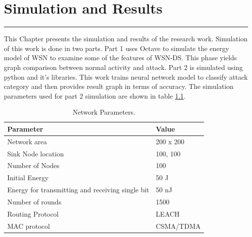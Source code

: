 \chapter{Simulation and Results}
\label{C6} %
\graphicspath{{Figures/PDF/}{Figures/PNG}}
\noindent\rule{\linewidth}{2pt}
This Chapter presents the simulation and results of the research work. Simulation of this work is done in two parts. Part 1 uses Octave to simulate the energy model of WSN to examine some of the features of WSN-DS. This phase yields graph comparison between normal activity and attack. Part 2 is simulated using python and it's libraries. This work trains neural network model to classify attack category and then provides result graph in terms of accuracy. The simulation parameters used for part 2 simulation are shown in table \ref{tab:NetPar}.
\begin{table}[bp]
\centering
\caption{Network Parameters.}
\label{tab:NetPar}
\begin{tabular}{|l|l|}
\hline
\textbf{Parameter} & \textbf{Value} \\ \hline
Network area & 200 x 200 \\ \hline
Sink Node location & 100, 100 \\ \hline
Number of Nodes & 100 \\ \hline
Initial Energy & 50 J \\ \hline
Energy for transmitting and receiving single bit & 50 nJ \\ \hline
Number of rounds & 1500 \\ \hline
Routing Protocol & LEACH \\ \hline
MAC protocol & CSMA/TDMA \\ \hline
\end{tabular}%
\end{table}
